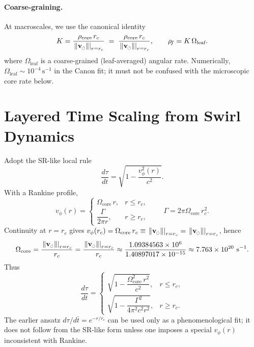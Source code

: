 \documentclass[11pt]{article}
\newcommand{\swirlarrow}{%
	\mathchoice{\mkern-2mu\scriptstyle\boldsymbol{\circlearrowleft}}%
	{\mkern-2mu\scriptstyle\boldsymbol{\circlearrowleft}}%
	{\mkern-2mu\scriptscriptstyle\boldsymbol{\circlearrowleft}}%
	{\mkern-2mu\scriptscriptstyle\boldsymbol{\circlearrowleft}}%
}
\newcommand{\vswirl}{\mathbf{v}_{\swirlarrow}}
\newcommand{\vscore}{v_s}                                %
\newcommand{\vnorm}{\lVert \vswirl \rVert}               %
\newcommand{\rhoF}{\rho_{\!f}}                           %
\newcommand{\rhoC}{\rho_{\mathrm{core}}} %
\providecommand{\rc}{r_c} %
\newcommand{\vcore}{\left.\vnorm\right|_{r=\rc}}        %
\renewcommand{\vscore}{\vcore}
\begin{document}
	\paragraph{Coarse-graining.}
	At macroscales, we use the canonical identity
	\[
		K=\frac{\rhoC\,r_c}{\vscore}\;=\;\frac{\rhoC\,\rc}{\left.\vnorm\right|_{r=\rc}},\qquad \rhoF=K\,\Omega_{\text{leaf}}.
	\]
	where $\Omega_{\text{leaf}}$ is a coarse-grained (leaf-averaged) angular rate. Numerically, $\Omega_{\text{leaf}}\sim 10^{-4}\,\mathrm{s^{-1}}$ in the Canon fit; it must not be confused with the microscopic core rate below.

	\section{Layered Time Scaling from Swirl Dynamics}
	Adopt the SR-like local rule
	\[
		\frac{d\tau}{dt}=\sqrt{1-\frac{v_\phi^{2}(r)}{c^{2}}}.
	\]
	With a Rankine profile,
	\[
		v_\phi(r)=
		\begin{cases}
			\Omega_{\text{core}}\,r, & r\le r_c,\\[4pt]
			\dfrac{\Gamma}{2\pi r}, & r\ge r_c,
		\end{cases}
		\qquad \Gamma=2\pi\Omega_{\text{core}}\,r_c^{2}.
	\]
	Continuity at $r=r_c$ gives $v_\phi(r_c)=\Omega_{\text{core}}\,r_c\equiv \vscore=\left.\vnorm\right|_{r=\rc}$, hence
	\[
		\Omega_{\text{core}}=\frac{\vscore}{r_c}=\frac{\left.\vnorm\right|_{r=\rc}}{\rc}\approx \frac{1.09384563\times 10^{6}}{1.40897017\times 10^{-15}}
		\approx 7.763\times 10^{20}\ \mathrm{s^{-1}}.
	\]
	Thus
	\[
		\frac{d\tau}{dt}=
		\begin{cases}
			\sqrt{1-\dfrac{\Omega_{\text{core}}^{2}\,r^{2}}{c^{2}}}, & r\le r_c,\\[6pt]
			\sqrt{1-\dfrac{\Gamma^{2}}{4\pi^{2}c^{2}r^{2}}}, & r\ge r_c.
		\end{cases}
	\]
	The earlier ansatz $d\tau/d\bar t=e^{-r/r_c}$ can be used only as a phenomenological fit; it does not follow from the SR-like form unless one imposes a special $v_\phi(r)$ inconsistent with Rankine.


    \newcommand{\Circulation}{\kappa}
    \newcommand{\Umax}{U_{\max}}
    \newcommand{\Uloc}{U_{\text{swirl}}}
    \newcommand{\chiS}{\chi_{\text{swirl}}}
\end{document}
